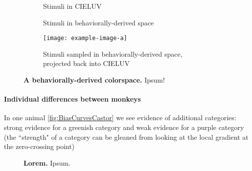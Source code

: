 \begin{figure}
    \centering
    \begin{subfigure}[b]{0.3\textwidth}
         \centering
         \caption{Stimuli in CIELUV \newline\newline}
         
         \label{fig:CIELUV}
    \end{subfigure}
    \hfill
    \begin{subfigure}[b]{0.3\textwidth}
         \centering
         \caption{Stimuli in behaviorally-derived space \newline}
         
         \label{fig:MACBEHspace}
    \end{subfigure}
    \hfill
    \begin{subfigure}[b]{0.3\textwidth}
         \centering
         \caption{Stimuli sampled in behaviorally-derived space, projected back into CIELUV}
         \texttt{[image: example-image-a]}
         \label{fig:UniformStimsInCIELUV}
    \end{subfigure}
           \caption{\textbf{A behaviorally-derived colorspace.} Ipsum!}
        \label{fig:MACBEHcolorspace}
    
\end{figure}

\paragraph{Individual differences between monkeys}

In one animal \autoref{fig:BiasCurvesCastor} we see evidence of additional categories: strong evidence for a greenish category and weak evidence for a purple category (the ``strength" of a category can be gleaned from looking at the local gradient at the zero-crossing point)

\begin{figure}

\caption{\textbf{Lorem.}
Ipsum.
}
\label{fig:IndiDataCogBias}
\end{figure}